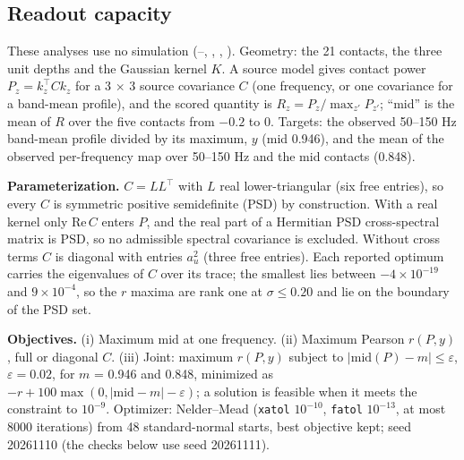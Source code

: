 \subsection{Readout capacity}

These analyses use no simulation (--, , , ). Geometry: the 21 contacts,
the three unit depths and the Gaussian kernel $K$. A source model gives contact power $P_z = k_z^\top C k_z$ for a
3 $\times$ 3 source covariance $C$ (one frequency, or one covariance for a band-mean profile), and the scored
quantity is $R_z = P_z/\max_{z'} P_{z'}$; ``mid'' is the mean of $R$ over the five contacts from $-0.2$ to 0.
Targets: the observed 50--150 Hz band-mean profile divided by its maximum, $y$ (mid 0.946), and the mean of the
observed per-frequency map over 50--150 Hz and the mid contacts (0.848).

\textbf{Parameterization.} $C = LL^\top$ with $L$ real lower-triangular (six free entries), so every $C$ is
symmetric positive semidefinite (PSD) by construction. With a real kernel only $\mathrm{Re}\,C$ enters $P$, and
the real part of a Hermitian PSD cross-spectral matrix is PSD, so no admissible spectral covariance is excluded.
Without cross terms $C$ is diagonal with entries $a_u^2$ (three free entries). Each reported optimum carries the
eigenvalues of $C$ over its trace; the smallest lies between $-4\times10^{-19}$ and $9\times10^{-4}$, so the $r$
maxima are rank one at $\sigma \leq 0.20$ and lie on the boundary of the PSD set.

\textbf{Objectives.} (i) Maximum mid at one frequency. (ii) Maximum Pearson $r(P, y)$, full or diagonal $C$. (iii)
Joint: maximum $r(P, y)$ subject to $|\text{mid}(P) - m| \leq \varepsilon$, $\varepsilon = 0.02$, for $m$ = 0.946
and 0.848, minimized as $-r + 100\max(0, |\text{mid} - m| - \varepsilon)$; a solution is feasible when it meets the
constraint to $10^{-9}$. Optimizer: Nelder--Mead (\texttt{xatol} $10^{-10}$, \texttt{fatol} $10^{-13}$, at most
8000 iterations) from 48 standard-normal starts, best objective kept; seed 20261110 (the checks below use seed 20261111).

